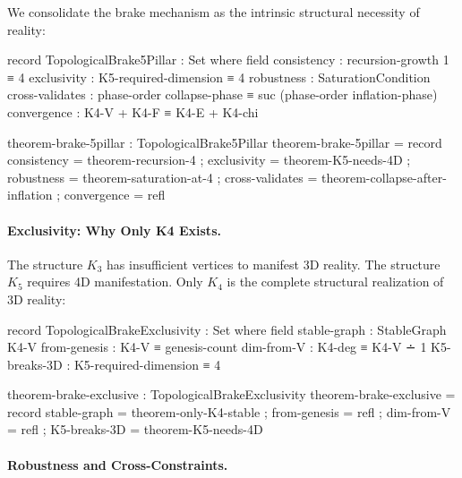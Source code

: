 \documentclass[11pt,a4paper]{book}
\begin{document}
We consolidate the brake mechanism as the intrinsic structural necessity of reality: 

\begin{code}
record TopologicalBrake5Pillar : Set where
  field
    consistency     : recursion-growth 1 ≡ 4
    exclusivity     : K5-required-dimension ≡ 4
    robustness      : SaturationCondition
    cross-validates : phase-order collapse-phase ≡ suc (phase-order inflation-phase)
    convergence     : K4-V + K4-F ≡ K4-E + K4-chi

theorem-brake-5pillar : TopologicalBrake5Pillar
theorem-brake-5pillar = record
  { consistency     = theorem-recursion-4
  ; exclusivity     = theorem-K5-needs-4D
  ; robustness      = theorem-saturation-at-4
  ; cross-validates = theorem-collapse-after-inflation
  ; convergence     = refl
  }
\end{code}

\paragraph{Exclusivity: Why Only K4 Exists.}

The structure $K_3$ has insufficient vertices to manifest 3D reality. The structure $K_5$ requires 4D manifestation. Only $K_4$ is the complete structural realization of 3D reality:

\begin{code}
record TopologicalBrakeExclusivity : Set where
  field
    stable-graph          : StableGraph K4-V
    from-genesis          : K4-V ≡ genesis-count
    dim-from-V            : K4-deg ≡ K4-V ∸ 1
    K5-breaks-3D          : K5-required-dimension ≡ 4

theorem-brake-exclusive : TopologicalBrakeExclusivity
theorem-brake-exclusive = record
  { stable-graph = theorem-only-K4-stable
  ; from-genesis = refl
  ; dim-from-V = refl
  ; K5-breaks-3D = theorem-K5-needs-4D
  }
\end{code}

\paragraph{Robustness and Cross-Constraints.}
\end{document}
